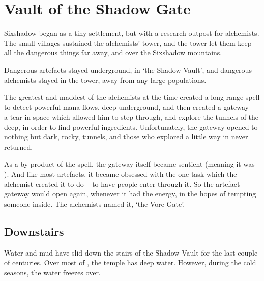 \section{Vault of the Shadow Gate}

\begin{multicols}{2}


\begin{exampletext}
  \noindent
  Sixshadow began as a tiny settlement, but with a research outpost for alchemists.
  The small villages sustained the alchemists' tower, and the tower let them keep all the dangerous things far away, and over the Sixshadow mountains.

  Dangerous \glspl{artefact} stayed underground, in `the Shadow Vault', and dangerous alchemists stayed in the tower, away from any large populations.

  The greatest and maddest of the alchemists at the time created a long-range spell to detect powerful mana flows, deep underground, and then created a gateway -- a tear in space which allowed him to step through, and explore the tunnels of the \gls{deep}, in order to find powerful \glspl{ingredient}.
  Unfortunately, the gateway opened to nothing but dark, rocky, tunnels, and those who explored a little way in never returned.

  As a by-product of the spell, the gateway itself became sentient (meaning it was ).
  And like most \glspl{artefact}, it became obsessed with the one task which the alchemist created it to do -- to have people enter through it.
  So the \gls{artefact} gateway would open again, whenever it had the energy, in the hopes of tempting someone inside.
  The alchemists named it, `the Vore Gate'.
\end{exampletext}

\subsection[\glsfmttext{curiosity}~Downstairs~\glsfmttext{poison}]{Downstairs}


\begin{exampletext}
  Water and mud have slid down the stairs of the Shadow Vault for the last couple of centuries.
  Over most of , the temple has deep water.
  However, during the cold seasons, the water freezes over.
\end{exampletext}


\end{multicols}
